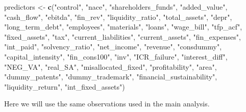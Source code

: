 \documentclass[]{article}
\newenvironment{Shaded}{\begin{snugshade}}{\end{snugshade}}
\newcommand{\DataTypeTok}[1]{\textcolor[rgb]{0.13,0.29,0.53}{#1}}
\newcommand{\DecValTok}[1]{\textcolor[rgb]{0.00,0.00,0.81}{#1}}
\newcommand{\FloatTok}[1]{\textcolor[rgb]{0.00,0.00,0.81}{#1}}
\newcommand{\KeywordTok}[1]{\textcolor[rgb]{0.13,0.29,0.53}{\textbf{#1}}}
\newcommand{\NormalTok}[1]{#1}
\newcommand{\OperatorTok}[1]{\textcolor[rgb]{0.81,0.36,0.00}{\textbf{#1}}}
\newcommand{\StringTok}[1]{\textcolor[rgb]{0.31,0.60,0.02}{#1}}
\begin{document}
\begin{Shaded}
\begin{Highlighting}[]
\NormalTok{predictors <-}\StringTok{ }\KeywordTok{c}\NormalTok{(}\StringTok{"control"}\NormalTok{, }\StringTok{"nace"}\NormalTok{, }\StringTok{"shareholders_funds"}\NormalTok{,}
                \StringTok{"added_value"}\NormalTok{, }\StringTok{"cash_flow"}\NormalTok{, }\StringTok{"ebitda"}\NormalTok{,}
                \StringTok{"fin_rev"}\NormalTok{, }\StringTok{"liquidity_ratio"}\NormalTok{, }\StringTok{"total_assets"}\NormalTok{,}
                \StringTok{"depr"}\NormalTok{, }\StringTok{"long_term_debt"}\NormalTok{, }\StringTok{"employees"}\NormalTok{,}
                \StringTok{"materials"}\NormalTok{, }\StringTok{"loans"}\NormalTok{, }\StringTok{"wage_bill"}\NormalTok{, }\StringTok{"tfp_acf"}\NormalTok{,}
                \StringTok{"fixed_assets"}\NormalTok{, }\StringTok{"tax"}\NormalTok{, }\StringTok{"current_liabilities"}\NormalTok{,}
                \StringTok{"current_assets"}\NormalTok{, }\StringTok{"fin_expenses"}\NormalTok{, }\StringTok{"int_paid"}\NormalTok{,}
                \StringTok{"solvency_ratio"}\NormalTok{, }\StringTok{"net_income"}\NormalTok{, }\StringTok{"revenue"}\NormalTok{,}
                \StringTok{"consdummy"}\NormalTok{, }\StringTok{"capital_intensity"}\NormalTok{, }\StringTok{"fin_cons100"}\NormalTok{,}
                \StringTok{"inv"}\NormalTok{, }\StringTok{"ICR_failure"}\NormalTok{, }\StringTok{"interest_diff"}\NormalTok{, }\StringTok{"NEG_VA"}\NormalTok{,}
                \StringTok{"real_SA"}\NormalTok{, }\StringTok{"misallocated_fixed"}\NormalTok{, }\StringTok{"profitability"}\NormalTok{,}
                \StringTok{"area"}\NormalTok{, }\StringTok{"dummy_patents"}\NormalTok{, }\StringTok{"dummy_trademark"}\NormalTok{,}
                \StringTok{"financial_sustainability"}\NormalTok{, }\StringTok{"liquidity_return"}\NormalTok{,}
                \StringTok{"int_fixed_assets"}\NormalTok{)}
\end{Highlighting}
\end{Shaded}

Here we will use the same observations used in the main analysis.

\begin{Shaded}
\end{Shaded}
\end{document}
